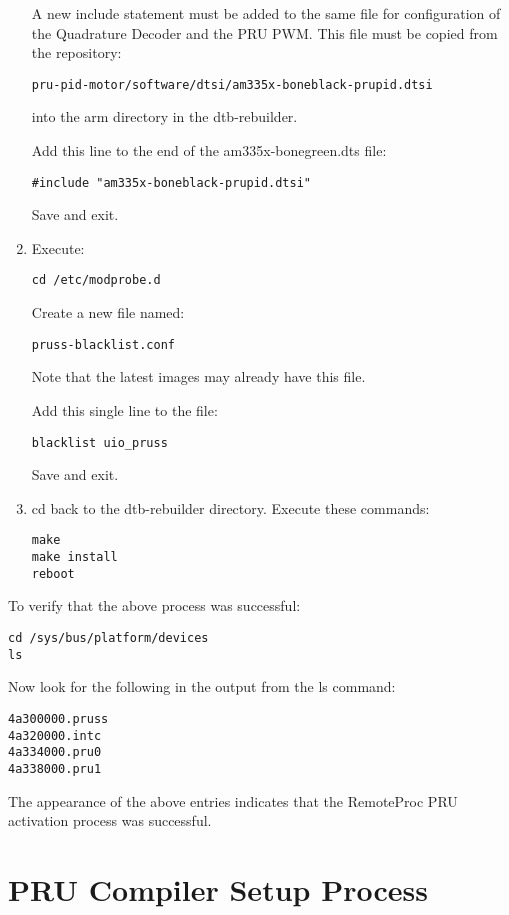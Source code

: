 \begin{enumerate}
A new include statement must be added to the same file for configuration of the Quadrature Decoder and the PRU PWM.  This file must be copied from the repository:

\begin{verbatim}
pru-pid-motor/software/dtsi/am335x-boneblack-prupid.dtsi
\end{verbatim}

into the arm directory in the dtb-rebuilder.

Add this line to the end of the am335x-bonegreen.dts file:

\begin{verbatim}
#include "am335x-boneblack-prupid.dtsi"
\end{verbatim}
 
Save and exit.
\item
Execute:
\begin{verbatim}
cd /etc/modprobe.d
\end{verbatim}
Create a new file named:
\begin{verbatim}
pruss-blacklist.conf
\end{verbatim}
Note that the latest images may already have this file.

Add this single line to the file:
\begin{verbatim}
blacklist uio_pruss
\end{verbatim}
Save and exit.
\item
cd back to the dtb-rebuilder directory.  Execute these commands:
\begin{verbatim}
make 
make install 
reboot
\end{verbatim} 
\end{enumerate}
To verify that the above process was successful:

\begin{verbatim}
cd /sys/bus/platform/devices
ls
\end{verbatim}

Now look for the following in the output from the ls command:
\begin{verbatim}
4a300000.pruss
4a320000.intc
4a334000.pru0
4a338000.pru1
\end{verbatim}

The appearance of the above entries indicates that the RemoteProc PRU activation process was successful.

\section{PRU Compiler Setup Process}

